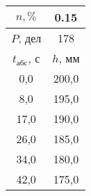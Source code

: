 \begin{tabular}[t]{|c|c|}
\hline
$n, \%$ & 0.15 \\
\hline
$P$, дел & 178 \\
\hline
$t_{абс}$, с & $h$, мм \\ 
\hline
0,0 & 200,0 \\ 
8,0 & 195,0 \\ 
17,0 & 190,0 \\ 
26,0 & 185,0 \\ 
34,0 & 180,0 \\ 
42,0 & 175,0 \\ 
\hline
\end{tabular}